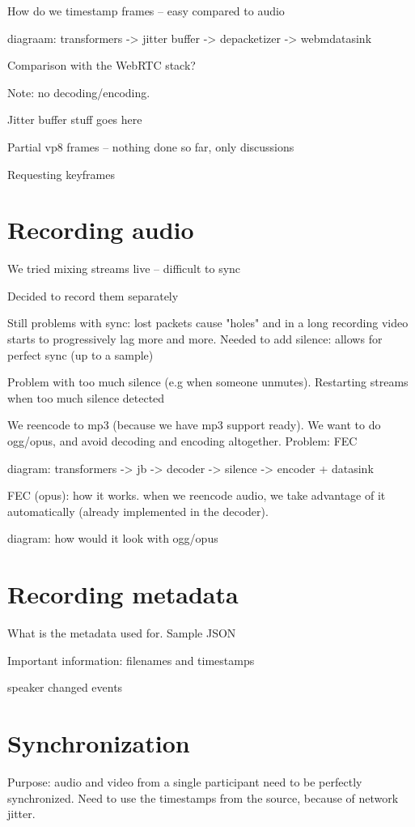 \documentclass[twoside,openright,a4paper,11pt,english]{article}
\begin{document}
How do we timestamp frames -- easy compared to audio

diagraam: transformers -> jitter buffer -> depacketizer -> webmdatasink

Comparison with the WebRTC stack?

Note: no decoding/encoding.

Jitter buffer stuff goes here

Partial vp8 frames -- nothing done so far, only discussions

Requesting keyframes

\section{Recording audio}
We tried mixing streams live -- difficult to sync

Decided to record them separately

Still problems with sync: lost packets cause "holes" and in a long recording video starts to progressively lag more and more.
Needed to add silence: allows for perfect sync (up to a sample)

Problem with too much silence (e.g when someone unmutes). Restarting streams when too much silence detected

We reencode to mp3 (because we have mp3 support ready). We want to do ogg/opus, and avoid decoding and encoding altogether. Problem: FEC

diagram:
transformers -> jb -> decoder -> silence -> encoder + datasink

FEC (opus): how it works. when we reencode audio, we take advantage of it automatically (already implemented in the decoder).

diagram: how would it look with ogg/opus
\section{Recording metadata}
What is the metadata used for. Sample JSON

Important information: filenames and timestamps

speaker changed events


\section{Synchronization}
Purpose: audio and video from a single participant need to be perfectly synchronized. Need to use the timestamps from the source, because of network jitter. 
\end{document}
